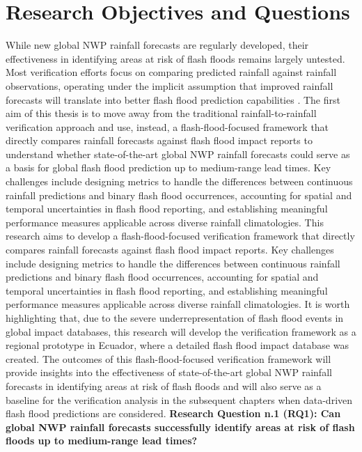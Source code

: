 \section{Research Objectives and Questions}

While  new global NWP rainfall forecasts are regularly developed, their effectiveness in identifying areas at risk of flash floods remains largely untested. Most verification efforts focus on comparing predicted rainfall against rainfall observations, operating under the implicit assumption that improved rainfall forecasts will translate into better flash flood prediction capabilities \citep{Gascon2024}. The first aim of this thesis is to move away from the traditional rainfall-to-rainfall verification approach and use, instead, a flash-flood-focused framework that directly compares rainfall forecasts against flash flood impact reports to understand whether state-of-the-art global NWP rainfall forecasts could serve as a basis for global flash flood prediction up to medium-range lead times. Key challenges include designing metrics to handle the differences between continuous rainfall predictions and binary flash flood occurrences, accounting for spatial and temporal uncertainties in flash flood reporting, and establishing meaningful performance measures applicable across diverse rainfall climatologies. This research aims to develop a flash-flood-focused verification framework that directly compares rainfall forecasts against flash flood impact reports. Key challenges include designing metrics to handle the differences between continuous rainfall predictions and binary flash flood occurrences, accounting for spatial and temporal uncertainties in flash flood reporting, and establishing meaningful performance measures applicable across diverse rainfall climatologies. It is worth highlighting that, due to the severe underrepresentation of flash flood events in global impact databases, this research will develop the verification framework as a regional prototype in Ecuador, where a detailed flash flood impact database was created. The outcomes of this flash-flood-focused verification framework will provide insights into the effectiveness of state-of-the-art global NWP rainfall forecasts in identifying areas at risk of flash floods and will also serve as a baseline for the verification analysis in the subsequent chapters when data-driven flash flood predictions are considered. \textbf{Research Question n.1 (RQ1): Can global NWP rainfall forecasts successfully identify areas at risk of flash floods up to medium-range lead times?}


